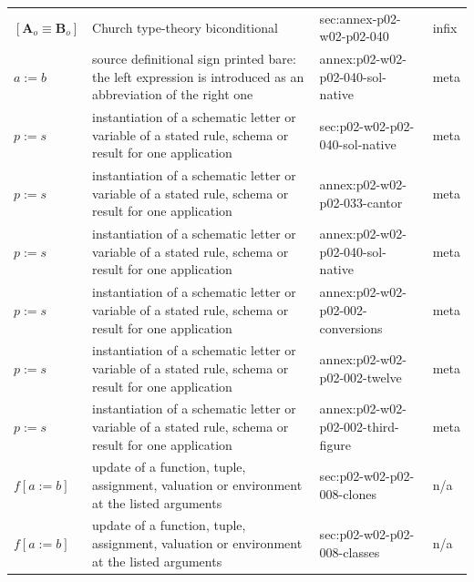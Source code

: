 \begin{longtable}{@{}p{}p{}p{}p{}@{}}
\([\mathbf A_o\equiv\mathbf B_o]\) & Church type-theory biconditional & sec:\allowbreak{}annex-\allowbreak{}p02-\allowbreak{}w02-\allowbreak{}p02-\allowbreak{}040 & infix \\
\(a:=b\) & source definitional sign printed bare: the left expression is introduced as an abbreviation of the right one & annex:\allowbreak{}p02-\allowbreak{}w02-\allowbreak{}p02-\allowbreak{}040-\allowbreak{}sol-\allowbreak{}native & meta \\
\(p:=s\) & instantiation of a schematic letter or variable of a stated rule, schema or result for one application & sec:\allowbreak{}p02-\allowbreak{}w02-\allowbreak{}p02-\allowbreak{}040-\allowbreak{}sol-\allowbreak{}native & meta \\
\(p:=s\) & instantiation of a schematic letter or variable of a stated rule, schema or result for one application & annex:\allowbreak{}p02-\allowbreak{}w02-\allowbreak{}p02-\allowbreak{}033-\allowbreak{}cantor & meta \\
\(p:=s\) & instantiation of a schematic letter or variable of a stated rule, schema or result for one application & annex:\allowbreak{}p02-\allowbreak{}w02-\allowbreak{}p02-\allowbreak{}040-\allowbreak{}sol-\allowbreak{}native & meta \\
\(p:=s\) & instantiation of a schematic letter or variable of a stated rule, schema or result for one application & annex:\allowbreak{}p02-\allowbreak{}w02-\allowbreak{}p02-\allowbreak{}002-\allowbreak{}conversions & meta \\
\(p:=s\) & instantiation of a schematic letter or variable of a stated rule, schema or result for one application & annex:\allowbreak{}p02-\allowbreak{}w02-\allowbreak{}p02-\allowbreak{}002-\allowbreak{}twelve & meta \\
\(p:=s\) & instantiation of a schematic letter or variable of a stated rule, schema or result for one application & annex:\allowbreak{}p02-\allowbreak{}w02-\allowbreak{}p02-\allowbreak{}002-\allowbreak{}third-\allowbreak{}figure & meta \\
\(f[a:=b]\) & update of a function, tuple, assignment, valuation or environment at the listed arguments & sec:\allowbreak{}p02-\allowbreak{}w02-\allowbreak{}p02-\allowbreak{}008-\allowbreak{}clones & n/a \\
\(f[a:=b]\) & update of a function, tuple, assignment, valuation or environment at the listed arguments & sec:\allowbreak{}p02-\allowbreak{}w02-\allowbreak{}p02-\allowbreak{}008-\allowbreak{}classes & n/a \\

\end{longtable}
